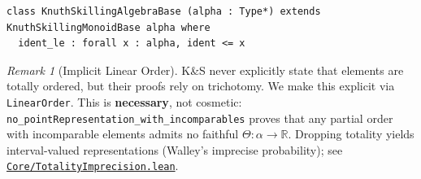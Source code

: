 \documentclass[11pt]{article}
\theoremstyle{definition}
\theoremstyle{remark}
\newtheorem{remark}[theorem]{Remark}
\begin{document}
\begin{lstlisting}[caption={K\&S probability base: identity is minimum (positivity)}]
class KnuthSkillingAlgebraBase (alpha : Type*) extends KnuthSkillingMonoidBase alpha where
  ident_le : forall x : alpha, ident <= x
\end{lstlisting}

\begin{remark}[Implicit Linear Order]
K\&S never explicitly state that elements are totally ordered, but their proofs rely on trichotomy.
We make this explicit via \texttt{LinearOrder}. This is \textbf{necessary}, not cosmetic:
\texttt{no\_pointRepresentation\_with\_incomparables} proves that any partial order with
incomparable elements admits no faithful $\Theta : \alpha \to \mathbb{R}$.
Dropping totality yields interval-valued representations (Walley's imprecise probability);
see \href{https://github.com/zariuq/ks-foundations-of-inference/blob/main/KnuthSkilling/Core/TotalityImprecision.lean}{\texttt{Core/TotalityImprecision.lean}}.
\end{remark}
\end{document}
